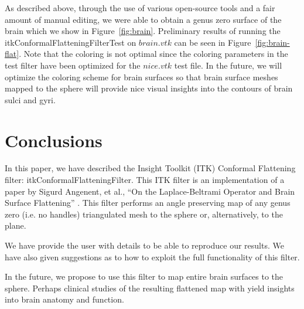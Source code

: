 \documentclass{InsightArticle}
\begin{document}
  As described above, through the use of various open-source tools and
  a fair amount of manual editing, we were able to obtain a genus zero
  surface of the brain which we show in
  Figure~\ref{fig:brain}. Preliminary results of running the
  itkConformalFlatteningFilterTest on $brain.vtk$ can be seen in
  Figure~\ref{fig:brain-flat}. Note that the coloring is not optimal
  since the coloring parameters in the test filter have been optimized
  for the $nice.vtk$ test file. In the future, we will optimize the
  coloring scheme for brain surfaces so that brain surface meshes
  mapped to the sphere will provide nice visual insights into the
  contours of brain sulci and gyri.

	\section{Conclusions}
	In this paper, we have described the Insight Toolkit (ITK) Conformal
	Flattening filter: itkConformalFlatteningFilter. This ITK filter is
	an implementation of a paper by Sigurd Angenent, et al., ``On the
	Laplace-Beltrami Operator and Brain Surface Flattening''
	\cite{angenent1999lbo}. This filter performs an angle preserving map
	of any genus zero (i.e. no handles) triangulated mesh to the sphere
	or, alternatively, to the plane.

	We have provide the user with details to be able to reproduce our
	results. We have also given suggestions as to how to exploit the
	full functionality of this filter.

	In the future, we propose to use this filter to map entire brain
	surfaces to the sphere. Perhaps clinical studies of the resulting
	flattened map with yield insights into brain anatomy and function.






\end{document}
